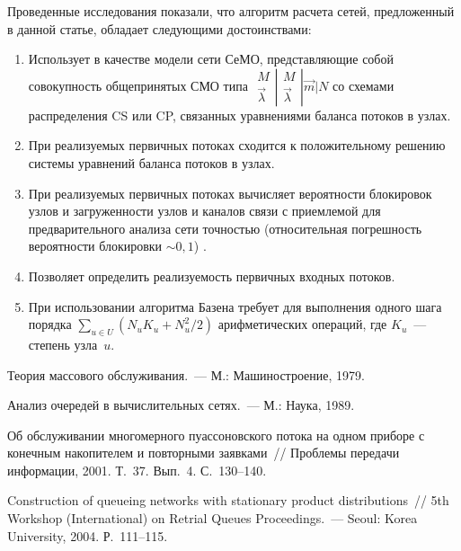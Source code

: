 \begin{multicols}{2}
     Проведенные исследования показали, что алгоритм расчета сетей, 
предложенный в данной статье, обладает следующими достоинствами:
     \begin{enumerate}[1.]
     \item Использует в качестве модели сети СеМО, представляющие собой 
совокупность общепринятых СМО типа $
      \begin{matrix}
      M \\ \vec{\lambda}
      \end{matrix}
      \left |
      \begin{matrix}
      M \\ \vec{\lambda}
      \end{matrix}
      \right |
\vec{m} \vert N$ со схемами распределения CS или CP, связанных 
уравнениями баланса потоков в узлах.
\item При реализуемых первичных потоках сходится к положительному 
решению системы уравнений баланса потоков в узлах.
\item При реализуемых первичных потоках вычисляет вероятности 
блокировок узлов и загруженности узлов и каналов связи с приемлемой 
для предварительного анализа сети точностью (относительная 
погрешность вероятности блокировки $\sim 0{,}1$) .
\item Позволяет определить реализуемость первичных входных потоков.
\item При использовании алгоритма Базена требует для выполнения 
одного шага порядка $\sum\limits_{u\in U} (N_uK_u+N_u^2/2)$ 
арифметических операций, где $K_u$~--- степень узла~$u$.
    \end{enumerate}


{\small\frenchspacing
{%
\begin{thebibliography}{99}    
Теория массового обслуживания.~--- М.: Машиностроение, 1979.

Анализ очередей в вычислительных сетях.~--- М.: Наука, 1989.

Об обслуживании многомерного пуассоновского потока на одном 
приборе с конечным накопителем и повторными заявками~// Проблемы 
передачи информации, 2001. Т.~37. Вып.~4. С.~130--140.

Construction of queueing networks with stationary product distributions~// 
5th Workshop (International) on Retrial Queues Proceedings.~--- Seoul: 
Korea University, 2004. Р.~111--115.


\end{thebibliography}}}
\end{multicols}
